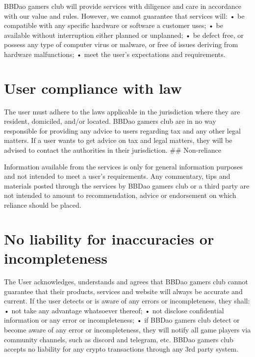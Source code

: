 \documentclass[
]{book}
\begin{document}
BBDao gamers club will provide services with diligence and care in accordance with our value and rules. However, we cannot guarantee that services will:
• be compatible with any specific hardware or software a customer uses;
• be available without interruption either planned or unplanned;
• be defect free, or possess any type of computer virus or malware, or free of issues deriving from hardware malfunctions;
• meet the user's expectations and requirements.

\hypertarget{user-compliance-with-law}{%
\section{User compliance with law}\label{user-compliance-with-law}}

The user must adhere to the laws applicable in the jurisdiction where they are resident, domiciled, and/or located. BBDao gamers club are in no way responsible for providing any advice to users regarding tax and any other legal matters.
If a user wants to get advice on tax and legal matters, they will be advised to contact the authorities in their jurisdiction.
\#\# Non-reliance

Information available from the services is only for general information purposes and not intended to meet a user's requirements. Any commentary, tips and materials posted through the services by BBDao gamers club or a third party are not intended to amount to recommendation, advice or endorsement on which reliance should be placed.

\hypertarget{no-liability-for-inaccuracies-or-incompleteness}{%
\section{No liability for inaccuracies or incompleteness}\label{no-liability-for-inaccuracies-or-incompleteness}}

The User acknowledges, understands and agrees that BBDao gamers club cannot guarantee that their products, services and website will always be accurate and current. If the user detects or is aware of any errors or incompleteness, they shall:
• not take any advantage whatsoever thereof;
• not disclose confidential information or any error or incompleteness;
• if BBDao gamers club detect or become aware of any error or incompleteness, they will notify all game players via community channels, such as discord and telegram, etc.
BBDao gamers club accepts no liability for any crypto transactions through any 3rd party system.
\end{document}

